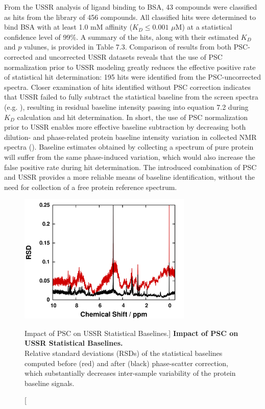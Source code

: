 \begin{doublespace}
From the USSR analysis of ligand binding to BSA, 43 compounds were classified
as hits from the library of 456 compounds. All classified hits were determined
to bind BSA with at least 1.0 mM affinity ($K_D \le 0.001$ $\mu$M) at a
statistical confidence level of 99\%. A summary of the hits, along with their
estimated $K_D$ and $p$ valunes, is provided in Table 7.3. Comparison of
results from both PSC-corrected and uncorrected USSR datasets reveals that the
use of PSC normalization prior to USSR modeling greatly reduces the effective
positive rate of statistical hit determination: 195 hits were identified from
the PSC-uncorrected spectra. Closer examination of hits identified without PSC
correction indicates that USSR failed to fully subtract the statistical
baseline from the screen spectra (e.g. ), resulting
in residual baseline intensity passing into equation 7.2 during $K_D$
calculation and hit determination. In short, the use of PSC normalization
prior to USSR enables more effective baseline subtraction by decreasing
both dilution- and phase-related protein baseline intensity variation in
collected \hnmr{} NMR spectra (). Baseline estimates
obtained by collecting a spectrum of pure protein will suffer from the same
phase-induced variation, which would also increase the false positive rate
during hit determination. The introduced combination of PSC and USSR
provides a more reliable means of baseline identification, without
the need for collection of a free protein reference spectrum.
\end{doublespace}

\begin{figure}
\includegraphics[width=3.25in]{figs/ussr/05-rsd.png}
\caption
      [Impact of PSC on USSR Statistical Baselines.]{
  {\bf Impact of PSC on USSR Statistical Baselines.}
  \\
  Relative standard deviations (RSDs) of the statistical baselines computed
  before (red) and after (black) phase-scatter correction, which substantially
  decreases inter-sample variability of the protein baseline signals.
}
\label{figure.7.5}
\end{figure}

